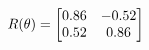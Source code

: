 \documentclass[preview]{standalone}
\begin{document}
\begin{align*}
\special{dvisvgm:raw <g id='unique000'>}R(\theta) = \begin{bmatrix}0.86 & -0.52\\0.52 & 0.86\end{bmatrix}\special{dvisvgm:raw </g>}
\end{align*}
\end{document}
